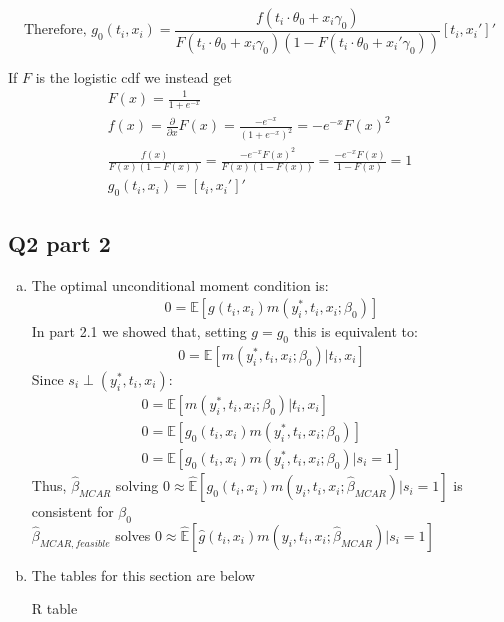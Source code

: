 \documentclass[11pt]{article}
\begin{document}
$$\text{Therefore, } g_0(t_i,x_i) = \frac{f(t_i \cdot \theta_0+x_i\gamma_0)}{F(t_i \cdot \theta_0+x_i\gamma_0)(1-F(t_i \cdot \theta_0 + x_i'\gamma_0))}[t_i,x_i']'$$


If $F$ is the logistic cdf we instead get 
\begin{align*}
F(x) = \frac{1}{1+e^{-x}}\\
f(x) = \frac{\partial}{\partial x}F(x) = \frac{-e^{-x}}{(1+e^{-x})^2} =-e^{-x}F(x)^2\\
\frac{f(x)}{F(x)(1-F(x))} = \frac{-e^{-x}F(x)^2}{F(x)(1-F(x))} = \frac{-e^{-x}F(x)}{1-F(x)} = 1 \\
g_0(t_i,x_i) = [t_i,x_i']'
\end{align*}

\subsection{Q2 part 2}
\begin{enumerate}[(a)]
	\item The optimal unconditional moment condition is:
	\begin{align*}
	0 = \mathbb{E}[g(t_i, x_i)m(y_i^*, t_i, x_i; \beta_0)]
	\end{align*}
	In part 2.1 we showed that, setting $g=g_0$ this is equivalent to:
	\begin{align*}
	0 = \mathbb{E}[m(y_i^*, t_i, x_i; \beta_0)|t_i,x_i]
	\end{align*}
	Since $s_i  \perp (y_i^*,t_i,x_i)$:
	\begin{align*}
	0 = \mathbb{E}[m(y_i^*, t_i, x_i; \beta_0)|t_i,x_i]\\
	0 = \mathbb{E}[g_0(t_i, x_i)m(y_i^*, t_i, x_i; \beta_0)]\\
	0 = \mathbb{E}[g_0(t_i, x_i)m(y_i^*, t_i, x_i; \beta_0) | s_i=1]
	\end{align*}
	Thus, $\hat{\beta}_{MCAR}$ solving $0 \approx \hat{\mathbb{E}}[g_0(t_i,x_i)m(y_i, t_i, x_i; \hat{\beta}_{MCAR})|s_i=1]$ is consistent for $\beta_0$\\
	$\hat{\beta}_{MCAR,feasible}$ solves $0 \approx \hat{\mathbb{E}}[\hat{g}(t_i,x_i)m(y_i, t_i, x_i; \hat{\beta}_{MCAR})|s_i=1]$
	
	\item The tables for this section are below \\
	
	\centerline{R table }
	\begin{center}
		
	\end{center}
	
\end{enumerate}
\end{document}
